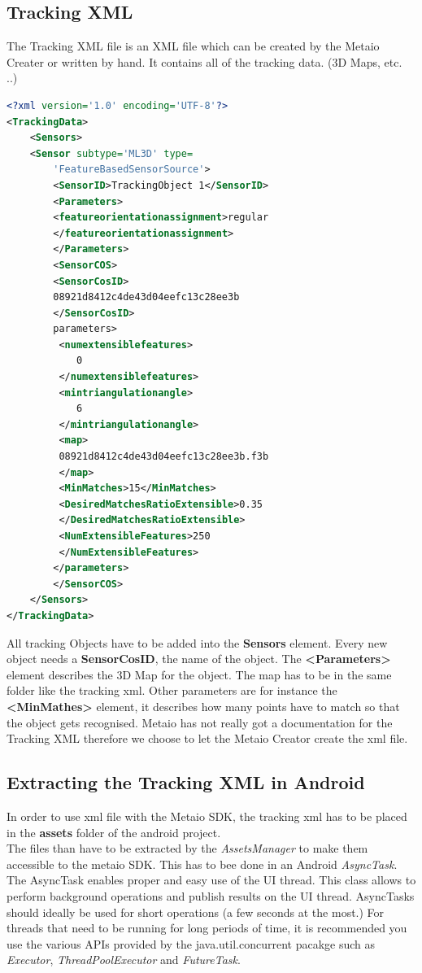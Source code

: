 \subsection{Tracking XML}
The Tracking XML file is an XML file which can be created by the Metaio Creater or written by hand. It contains all of the tracking data. (3D Maps, etc. ..)
\begin{lstlisting}[language=xml, caption=Tracking XML example,captionpos=b]
<?xml version='1.0' encoding='UTF-8'?>
<TrackingData>
	<Sensors>
	<Sensor subtype='ML3D' type=
		'FeatureBasedSensorSource'>
		<SensorID>TrackingObject 1</SensorID>
		<Parameters>
		<featureorientationassignment>regular
		</featureorientationassignment>
		</Parameters>
		<SensorCOS>
		<SensorCosID>
		08921d8412c4de43d04eefc13c28ee3b
		</SensorCosID>
		parameters>
		 <numextensiblefeatures>
		 	0
		 </numextensiblefeatures>
		 <mintriangulationangle>
		 	6
		 </mintriangulationangle>
		 <map>
		 08921d8412c4de43d04eefc13c28ee3b.f3b
		 </map>
		 <MinMatches>15</MinMatches>
		 <DesiredMatchesRatioExtensible>0.35
		 </DesiredMatchesRatioExtensible>
		 <NumExtensibleFeatures>250
		 </NumExtensibleFeatures>
		</parameters>
		</SensorCOS>	
	</Sensors>
</TrackingData>
\end{lstlisting}
All tracking Objects have to be added into the \textbf{Sensors} element. Every new object needs a \textbf{SensorCosID}, the name of the object. The \textbf{<Parameters>} element describes the 3D Map for the object. The map has to be in the same folder like the tracking xml. Other parameters are for instance the  \textbf{<MinMathes>} element, it describes how many points have to match so that the object gets recognised. Metaio has not really got a documentation for the Tracking XML therefore we choose to let the Metaio Creator create the xml file.


\subsection{Extracting the Tracking XML in Android}
In order to use xml file with the Metaio SDK, the tracking xml has to be placed in the \textbf{assets} folder of the android project.
\\


The files than have to be extracted by the \textit{AssetsManager} to make them accessible to the metaio SDK. This has to bee done in an Android \textit{AsyncTask}.
\\

The AsyncTask enables proper and easy use of the UI thread. This class allows to perform background operations and publish results on the UI thread. AsyncTasks should ideally be used for short operations (a few seconds at the most.) For threads that need to be running for long periods of time, it is recommended you use the various APIs provided by the java.util.concurrent pacakge such as \textit{Executor}, \textit{ThreadPoolExecutor} and \textit{FutureTask}.\cite{andoirdAsyncTask} 

